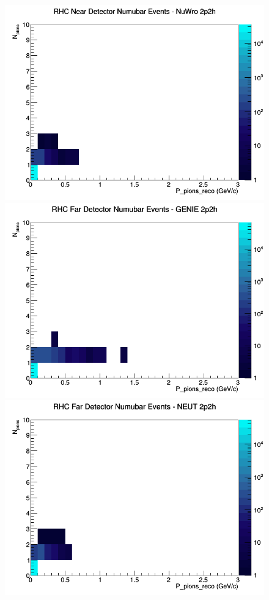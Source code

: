 \documentclass[12pt]{article}
\begin{document}
\begin{figure}[h]
\includegraphics[width=\linewidth]{eff_N_P/LAr/pions/2p2h_RHC_ND_numubar_N_P_NuWro.png}
\endminipage
\newline
{}
\includegraphics[width=\linewidth]{eff_N_P/LAr/pions/2p2h_RHC_FD_numubar_N_P_GENIE.png}
\endminipage
{}
\includegraphics[width=\linewidth]{eff_N_P/LAr/pions/2p2h_RHC_FD_numubar_N_P_NEUT.png}

\end{figure}
\end{document}
